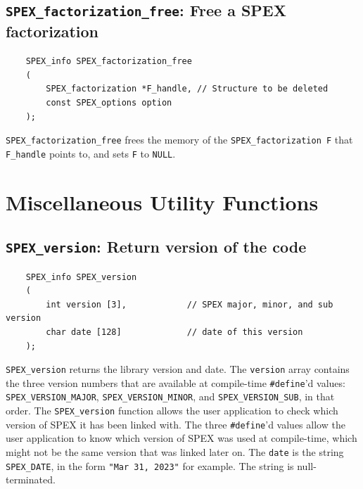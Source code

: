 \documentclass[12pt,oneside]{book}
\theoremstyle{definition}
\begin{document}
\subsection{\texttt{SPEX\_factorization\_free}: Free a SPEX factorization} \label{ss:spex_factorization_free}
\begin{mdframed}[userdefinedwidth=\textwidth]
{\footnotesize
\begin{verbatim}
    SPEX_info SPEX_factorization_free
    (
        SPEX_factorization *F_handle, // Structure to be deleted
        const SPEX_options option
    ); 
\end{verbatim}
} \end{mdframed}

\verb|SPEX_factorization_free| frees the memory of the \verb|SPEX_factorization F| that \verb|F_handle| points to, and sets \verb|F| to \verb|NULL|.

\newpage
\section{Miscellaneous Utility Functions}

\subsection{\texttt{SPEX\_version}: Return version of the code}
\label{spexver}
\begin{mdframed}[userdefinedwidth=\textwidth]
{\footnotesize
\begin{verbatim}
    SPEX_info SPEX_version
    (
        int version [3],            // SPEX major, minor, and sub version
        char date [128]             // date of this version
    );
\end{verbatim}
} \end{mdframed}

\verb|SPEX_version| returns the library version and date.
The \verb'version' array contains the three version
numbers that are available at compile-time \verb'#define''d values:
\verb'SPEX_VERSION_MAJOR',
\verb'SPEX_VERSION_MINOR', and
\verb'SPEX_VERSION_SUB', in that order.  The \verb'SPEX_version' function
allows the user application to check which version of SPEX it has been
linked with.  The three \verb'#define''d values allow the user application
to know which version of SPEX was used at compile-time, which might not
be the same version that was linked later on.
The \verb'date' is the string \verb'SPEX_DATE', in the form
\verb'"Mar 31, 2023"' for example.  The string is null-terminated.
\end{document}
